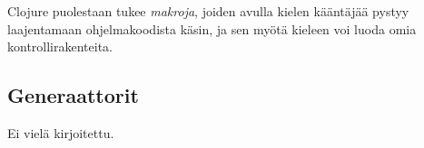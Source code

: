 Clojure puolestaan tukee \textit{makroja}, joiden avulla kielen kääntäjää pystyy laajentamaan ohjelmakoodista käsin, ja sen myötä kieleen voi luoda omia kontrollirakenteita.

\subsection{Generaattorit}

Ei vielä kirjoitettu.

% 
% 
% 
% 
% 

